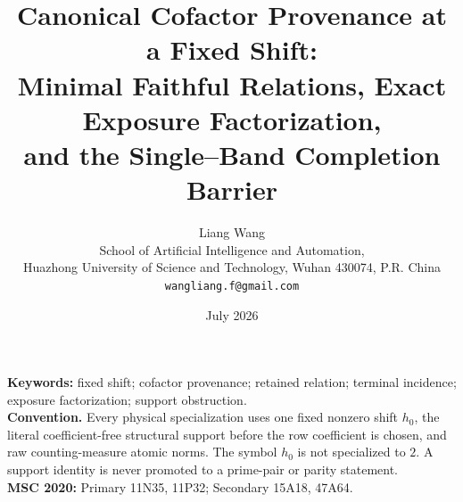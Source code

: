 \documentclass[11pt]{article}
\title{Canonical Cofactor Provenance at a Fixed Shift:\\
Minimal Faithful Relations, Exact Exposure Factorization,\\
and the Single--Band Completion Barrier}
\author{Liang Wang\\
School of Artificial Intelligence and Automation,\\
Huazhong University of Science and Technology, Wuhan 430074, P.R. China\\
\texttt{wangliang.f@gmail.com}}
\date{July 2026}
\theoremstyle{remark}
\begin{document}
\maketitle


\noindent\textbf{Keywords:} fixed shift; cofactor provenance; retained relation;
terminal incidence; exposure factorization; support obstruction.\\[0.5em]
\noindent\textbf{Convention.} Every physical specialization uses one fixed
nonzero shift \(h_0\), the literal coefficient-free structural support before
the row coefficient is chosen, and raw counting-measure atomic norms.  The
symbol \(h_0\) is not specialized to \(2\).  A support identity is never
promoted to a prime-pair or parity statement.\\[0.5em]
\noindent\textbf{MSC 2020:} Primary 11N35, 11P32; Secondary 15A18, 47A64.











\begingroup
\small
\raggedright


\endgroup
\end{document}
